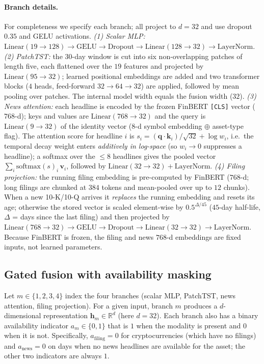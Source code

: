 \documentclass[runningheads]{llncs}
\begin{document}
\paragraph{Branch details.}
For completeness we specify each branch; all project to $d = 32$ and use dropout
$0.35$ and GELU activations. \emph{(1) Scalar MLP:}
$\mathrm{Linear}(19{\to}128) \to \mathrm{GELU} \to \mathrm{Dropout} \to
\mathrm{Linear}(128{\to}32) \to \mathrm{LayerNorm}$. \emph{(2) PatchTST:} the
$30$-day window is cut into six non-overlapping patches of length five, each
flattened over the $19$ features and projected by
$\mathrm{Linear}(95{\to}32)$; learned positional embeddings are added and two
transformer blocks ($4$ heads, feed-forward $32{\to}64{\to}32$) are applied,
followed by mean pooling over patches. The internal model width equals the
fusion width ($32$). \emph{(3) News attention:} each headline is encoded by the
frozen FinBERT \texttt{[CLS]} vector ($768$-d); keys and values are
$\mathrm{Linear}(768{\to}32)$ and the query is $\mathrm{Linear}(9{\to}32)$ of
the identity vector (8-d symbol embedding $\oplus$ asset-type flag). The
attention score for headline $i$ is
$s_i = (\mathbf{q}\!\cdot\!\mathbf{k}_i)/\sqrt{32} + \log w_i$, i.e.\ the temporal
decay weight enters \emph{additively in log-space} (so $w_i\!\to\!0$ suppresses a
headline); a softmax over the $\le 8$ headlines gives the pooled vector
$\sum_i \mathrm{softmax}(s)_i\,\mathbf{v}_i$, followed by
$\mathrm{Linear}(32{\to}32) + \mathrm{LayerNorm}$. \emph{(4) Filing projection:}
the running filing embedding is pre-computed by FinBERT ($768$-d; long filings
are chunked at $384$ tokens and mean-pooled over up to $12$ chunks). When a new
10-K/10-Q arrives it \emph{replaces} the running embedding and resets its age;
otherwise the stored vector is scaled element-wise by
$0.5^{\Delta/45}$ ($45$-day half-life, $\Delta$ = days since the last filing)
and then projected by
$\mathrm{Linear}(768{\to}32)\to\mathrm{GELU}\to\mathrm{Dropout}\to
\mathrm{Linear}(32{\to}32)\to\mathrm{LayerNorm}$. Because FinBERT is frozen, the
filing and news $768$-d embeddings are fixed inputs, not learned parameters.

\subsection{Gated fusion with availability masking}
Let $m \in \{1,2,3,4\}$ index the four branches (scalar MLP, PatchTST, news
attention, filing projection). For a given input, branch $m$ produces a
$d$-dimensional representation $\mathbf{h}_m \in \mathbb{R}^{d}$ (here $d=32$).
Each branch also has a binary availability indicator $a_m \in \{0,1\}$ that is
$1$ when the modality is present and $0$ when it is not. Specifically,
$a_{\text{filing}} = 0$ for cryptocurrencies (which have no filings) and
$a_{\text{news}} = 0$ on days when no news headlines are available for the
asset; the other two indicators are always $1$.
\end{document}
